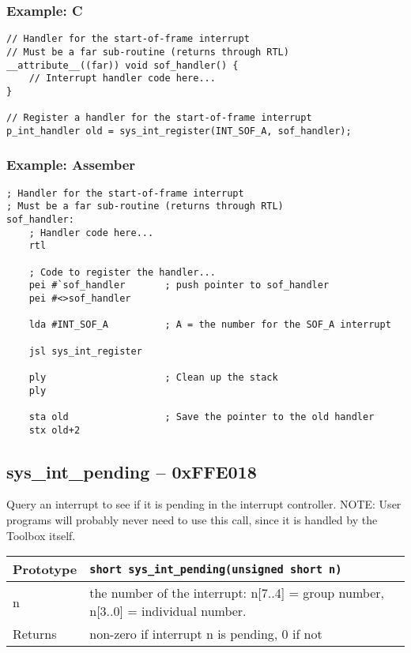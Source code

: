 \subsubsection*{Example: C}
\begin{lstlisting}
// Handler for the start-of-frame interrupt
// Must be a far sub-routine (returns through RTL)
__attribute__((far)) void sof_handler() {
	// Interrupt handler code here...
}

// Register a handler for the start-of-frame interrupt
p_int_handler old = sys_int_register(INT_SOF_A, sof_handler);
\end{lstlisting}

\subsubsection*{Example: Assember}
\begin{verbatim}
; Handler for the start-of-frame interrupt
; Must be a far sub-routine (returns through RTL)
sof_handler:
    ; Handler code here...
    rtl

    ; Code to register the handler...
    pei #`sof_handler       ; push pointer to sof_handler
    pei #<>sof_handler

    lda #INT_SOF_A          ; A = the number for the SOF_A interrupt
	
    jsl sys_int_register

    ply                     ; Clean up the stack
    ply

    sta old                 ; Save the pointer to the old handler
    stx old+2
\end{verbatim}

\subsection*{sys\_int\_pending -- 0xFFE018}
Query an interrupt to see if it is pending in the interrupt controller.
NOTE: User programs will probably never need to use this call, since it is handled by the Toolbox itself.

\bigskip

\begin{tabular}{|l||l|} \hline
Prototype & \lstinline!short sys_int_pending(unsigned short n)! \\ \hline
n & the number of the interrupt: n[7..4] = group number, n[3..0] = individual number. \\ \hline
Returns & non-zero if interrupt n is pending, 0 if not \\ \hline
\end{tabular}

